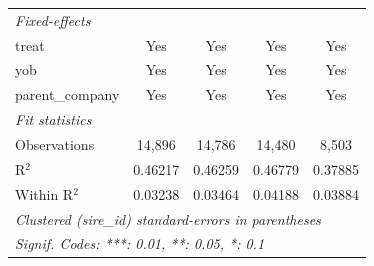\begin{table}[htbp]
\begin{tabular}{lcccc}
      \midrule
      \emph{Fixed-effects}\\
      treat                        & Yes                   & Yes                  & Yes                  & Yes\\  
      yob                          & Yes                   & Yes                  & Yes                  & Yes\\  
      parent\_company              & Yes                   & Yes                  & Yes                  & Yes\\  
      \midrule
      \emph{Fit statistics}\\
      Observations                 & 14,896                & 14,786               & 14,480               & 8,503\\  
      R$^2$                        & 0.46217               & 0.46259              & 0.46779              & 0.37885\\  
      Within R$^2$                 & 0.03238               & 0.03464              & 0.04188              & 0.03884\\  
      \midrule \midrule
      \multicolumn{5}{l}{\emph{Clustered (sire\_id) standard-errors in parentheses}}\\
      \multicolumn{5}{l}{\emph{Signif. Codes: ***: 0.01, **: 0.05, *: 0.1}}\\
   \end{tabular}
\end{table}


